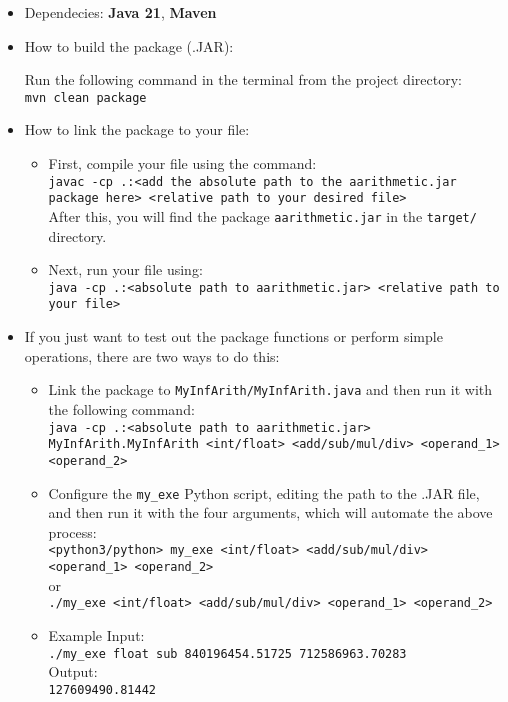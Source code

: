 \documentclass[15pt]{article}
\begin{document}
\begin{itemize}
    \item Dependecies: \textbf{Java 21}, \textbf{Maven}
    \item How to build the package (.JAR):
    
    Run the following command in the terminal from the project directory:\\
    \texttt{mvn clean package}

    \item How to link the package to your file:
    
    \begin{itemize}
        \item First, compile your file using the command:\\
        \texttt{javac -cp .:<add the absolute path to the aarithmetic.jar package here> <relative path to your desired file>}\\
        After this, you will find the package \texttt{aarithmetic.jar} in the \texttt{target/} directory.

        \item Next, run your file using:\\
        \texttt{java -cp .:<absolute path to aarithmetic.jar> <relative path to your file>}
    \end{itemize}

    \item If you just want to test out the package functions or perform simple operations, there are two ways to do this:
    \
    \begin{itemize}
        \item Link the package to \texttt{MyInfArith/MyInfArith.java} and then run it with the following command:\\
        \texttt{java -cp .:<absolute path to aarithmetic.jar> MyInfArith.MyInfArith <int/float> <add/sub/mul/div> <operand\_1> <operand\_2>}

        \item Configure the \texttt{my\_exe} Python script, editing the path to the .JAR file, and then run it with the four arguments, which will automate the above process:\\
        \texttt{<python3/python> my\_exe <int/float> <add/sub/mul/div> <operand\_1> <operand\_2>}\\
        or\\
        \texttt{./my\_exe <int/float> <add/sub/mul/div> <operand\_1> <operand\_2>}

        \item Example Input:\\
        \texttt{./my\_exe float sub 840196454.51725 712586963.70283}\\
        Output:\\
        \texttt{127609490.81442}
    \end{itemize}
\end{itemize}
\end{document}
